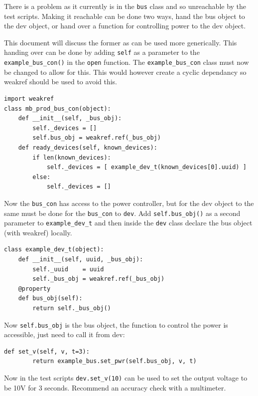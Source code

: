 \documentclass[a4paper,12pt, notitlepage]{article}
\begin{document}
There is a problem as it currently is in the \lstinline!bus! class and so unreachable by the test scripts. Making it reachable can be done two ways, hand the bus object to the dev object, or hand over a function for controlling power to the dev object.

This document will discuss the former as can be used more generically. This handing over can be done by adding \lstinline!self! as a parameter to the \lstinline!example_bus_con()! in the \lstinline!open! function. The \lstinline!example_bus_con! class must now be changed to allow for this. This would however create a cyclic dependancy so weakref should be used to avoid this.

\begin{lstlisting}[label={lst: adjpwrStruct5},caption={Handing the bus object forwards to the bus\_con}]
import weakref
class mb_prod_bus_con(object):
    def __init__(self, _bus_obj):
        self._devices = []
        self.bus_obj = weakref.ref(_bus_obj)
    def ready_devices(self, known_devices):
        if len(known_devices):
            self._devices = [ example_dev_t(known_devices[0].uuid) ]
        else:
            self._devices = []
\end{lstlisting}

Now the \lstinline!bus_con! has access to the power controller, but for the dev object to the same must be done for the \lstinline!bus_con! to \lstinline!dev!. Add \lstinline!self.bus_obj()! as a second parameter to \lstinline!example_dev_t! and then inside the \lstinline!dev! class declare the bus object (with weakref) locally.

\begin{lstlisting}[label={lst: adjpwrStruct6},caption={Final hand over to dev object.}]
class example_dev_t(object):
    def __init__(self, uuid, _bus_obj):
        self._uuid    = uuid
        self._bus_obj = weakref.ref(_bus_obj)
    @property
    def bus_obj(self):
        return self._bus_obj()
\end{lstlisting}

Now \lstinline!self.bus_obj! is the bus object, the function to control the power is accessible, just need to call it from dev:

\begin{lstlisting}[label={lst: adjpwrStruct6},caption={Setting the function in the dev class.}]
    def set_v(self, v, t=3):
        return example_bus.set_pwr(self.bus_obj, v, t)
\end{lstlisting}

Now in the test scripts \lstinline!dev.set_v(10)! can be used to set the output voltage to be 10V for 3 seconds. Recommend an accuracy check with a multimeter.
\end{document}
